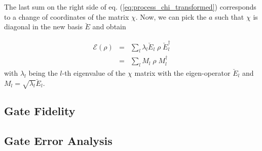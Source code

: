 The last sum on the right side of eq. (\ref{eq:process_chi_transformed}) corresponds to a change of coordinates of the matrix $\chi$. Now, we can pick the $a$ such that $\chi$ is diagonal in the new basis $\breve{E}$ and obtain

\begin{eqnarray}
 \mathcal{E}(\rho) & = &  \sum\limits_{l} \lambda_l \breve{E}_l \; \rho \; \breve{E}_l^\dagger \\
& = &  \sum\limits_{l} M_l \; \rho \; M_l^\dagger
\end{eqnarray}
with $\lambda_l$ being the $l$-th eigenvalue of the $\chi$ matrix with the eigen-operator $\breve{E}_l$ and $M_{l} = \sqrt{\lambda_l} \breve{E}_l$.

\subsection{Gate Fidelity}

\subsection{Gate Error Analysis}


